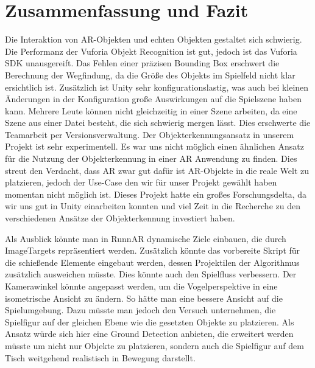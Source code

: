 \chapter{Zusammenfassung und Fazit}
\label{sec:conclusion}

Die Interaktion von AR-Objekten und echten Objekten gestaltet sich schwierig. Die Performanz der Vuforia Objekt Recognition ist gut, jedoch ist das Vuforia SDK unausgereift. Das Fehlen einer präzisen Bounding Box erschwert die Berechnung der Wegfindung, da die Größe des Objekts im Spielfeld nicht klar ersichtlich ist. Zusätzlich ist Unity sehr konfigurationslastig, was auch bei kleinen Änderungen in der Konfiguration große Auswirkungen auf die Spielszene haben kann.  Mehrere Leute können nicht gleichzeitig in einer Szene arbeiten, da eine Szene aus einer Datei besteht, die sich schwierig mergen lässt. Dies erschwerte die Teamarbeit per Versionsverwaltung. Der Objekterkennungsansatz in unserem Projekt ist sehr experimentell. Es war uns nicht möglich einen ähnlichen Ansatz für die Nutzung der Objekterkennung in einer AR Anwendung zu finden. Dies streut den Verdacht, dass AR zwar gut dafür ist AR-Objekte in die reale Welt zu platzieren, jedoch der Use-Case den wir für unser Projekt gewählt haben momentan nicht möglich ist. Dieses Projekt hatte ein großes Forschungsdelta, da wir uns gut in Unity einarbeiten konnten und viel Zeit in die Recherche zu den verschiedenen Ansätze der Objekterkennung investiert haben. 


Als Ausblick könnte man in RunnAR dynamische Ziele einbauen, die durch ImageTargets repräsentiert werden. Zusätzlich könnte das vorbereite Skript für die schießende Elemente eingebaut werden, dessen Projektilen der Algorithmus zusätzlich ausweichen müsste. Dies könnte auch den Spielfluss verbessern. Der Kamerawinkel könnte angepasst werden, um die Vogelperspektive in eine isometrische Ansicht zu ändern. So hätte man eine bessere Ansicht auf die Spielumgebung. Dazu müsste man jedoch den Versuch unternehmen, die Spielfigur auf der gleichen Ebene wie die gesetzten Objekte zu platzieren. Als Ansatz würde sich hier eine Ground Detection anbieten, die erweitert werden müsste um nicht nur Objekte zu platzieren, sondern auch die Spielfigur auf dem Tisch weitgehend realistisch in Bewegung darstellt.